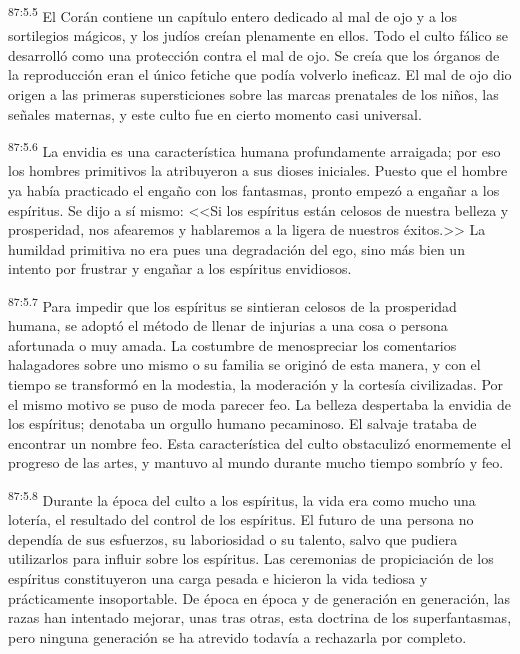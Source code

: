 \documentclass[twoside, 11pt]{book}
\begin{document}
\par
\textsuperscript{87:5.5} El Corán contiene un capítulo entero dedicado al mal de ojo y a los sortilegios mágicos, y los judíos creían plenamente en ellos. Todo el culto fálico se desarrolló como una protección contra el mal de ojo. Se creía que los órganos de la reproducción eran el único fetiche que podía volverlo ineficaz. El mal de ojo dio origen a las primeras supersticiones sobre las marcas prenatales de los niños, las señales maternas, y este culto fue en cierto momento casi universal.

\par
\textsuperscript{87:5.6} La envidia es una característica humana profundamente arraigada; por eso los hombres primitivos la atribuyeron a sus dioses iniciales. Puesto que el hombre ya había practicado el engaño con los fantasmas, pronto empezó a engañar a los espíritus. Se dijo a sí mismo: <<Si los espíritus están celosos de nuestra belleza y prosperidad, nos afearemos y hablaremos a la ligera de nuestros éxitos.>> La humildad primitiva no era pues una degradación del ego, sino más bien un intento por frustrar y engañar a los espíritus envidiosos.

\par
\textsuperscript{87:5.7} Para impedir que los espíritus se sintieran celosos de la prosperidad humana, se adoptó el método de llenar de injurias a una cosa o persona afortunada o muy amada. La costumbre de menospreciar los comentarios halagadores sobre uno mismo o su familia se originó de esta manera, y con el tiempo se transformó en la modestia, la moderación y la cortesía civilizadas. Por el mismo motivo se puso de moda parecer feo. La belleza despertaba la envidia de los espíritus; denotaba un orgullo humano pecaminoso. El salvaje trataba de encontrar un nombre feo. Esta característica del culto obstaculizó enormemente el progreso de las artes, y mantuvo al mundo durante mucho tiempo sombrío y feo.

\par
\textsuperscript{87:5.8} Durante la época del culto a los espíritus, la vida era como mucho una lotería, el resultado del control de los espíritus. El futuro de una persona no dependía de sus esfuerzos, su laboriosidad o su talento, salvo que pudiera utilizarlos para influir sobre los espíritus. Las ceremonias de propiciación de los espíritus constituyeron una carga pesada e hicieron la vida tediosa y prácticamente insoportable. De época en época y de generación en generación, las razas han intentado mejorar, unas tras otras, esta doctrina de los superfantasmas, pero ninguna generación se ha atrevido todavía a rechazarla por completo.
\end{document}
